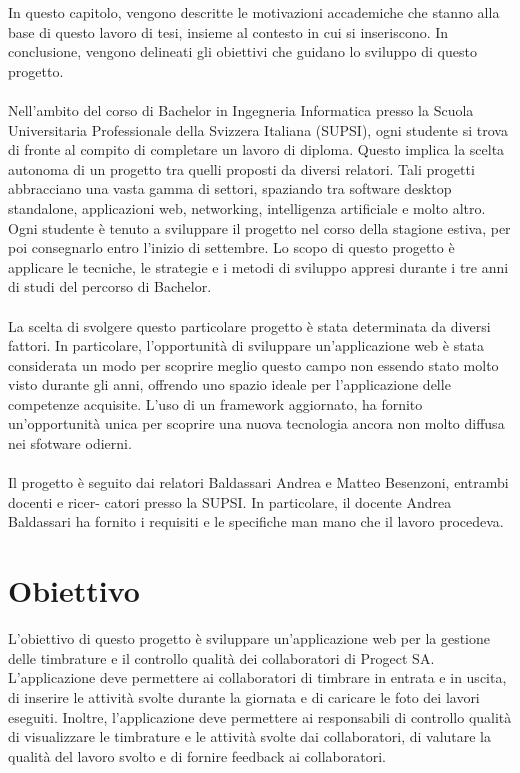 \documentclass[twoside]{supsistudent}
\begin{document}
In questo capitolo, vengono descritte le motivazioni accademiche che stanno alla base di
questo lavoro di tesi, insieme al contesto in cui si inseriscono. In conclusione, vengono
delineati gli obiettivi che guidano lo sviluppo di questo progetto.\\
\\
Nell'ambito del corso di Bachelor in Ingegneria Informatica presso la Scuola Universitaria
Professionale della Svizzera Italiana (SUPSI), ogni studente si trova di fronte al compito di
completare un lavoro di diploma. Questo implica la scelta autonoma di un progetto tra quelli
proposti da diversi relatori. Tali progetti abbracciano una vasta gamma di settori, spaziando
tra software desktop standalone, applicazioni web, networking, intelligenza artificiale e molto
altro. Ogni studente è tenuto a sviluppare il progetto nel corso della stagione estiva, per poi
consegnarlo entro l'inizio di settembre. Lo scopo di questo progetto è applicare le tecniche,
le strategie e i metodi di sviluppo appresi durante i tre anni di studi del percorso di Bachelor.\\
\\
La scelta di svolgere questo particolare progetto è stata determinata da diversi fattori. In
particolare, l'opportunità di sviluppare un'applicazione web è stata considerata un modo
per scoprire meglio questo campo non essendo stato molto visto durante gli anni, offrendo
uno spazio ideale per l'applicazione delle competenze acquisite. L'uso di un framework
aggiornato, ha fornito un'opportunità unica per scoprire una nuova tecnologia ancora non molto
diffusa nei sfotware odierni.\\
\\
Il progetto è seguito dai relatori Baldassari Andrea e Matteo Besenzoni, entrambi docenti e ricer-
catori presso la SUPSI. In particolare, il docente Andrea Baldassari ha fornito i requisiti e le specifiche man mano che il lavoro procedeva.

\section{Obiettivo}
L'obiettivo di questo progetto è sviluppare un'applicazione web per la gestione delle timbrature
e il controllo qualità dei collaboratori di Progect SA. L'applicazione deve permettere ai
collaboratori di timbrare in entrata e in uscita, di inserire le attività svolte durante la giornata
e di caricare le foto dei lavori eseguiti. Inoltre, l'applicazione deve permettere ai responsabili
di controllo qualità di visualizzare le timbrature e le attività svolte dai collaboratori, di
valutare la qualità del lavoro svolto e di fornire feedback ai collaboratori.\\
\\
\end{document}

